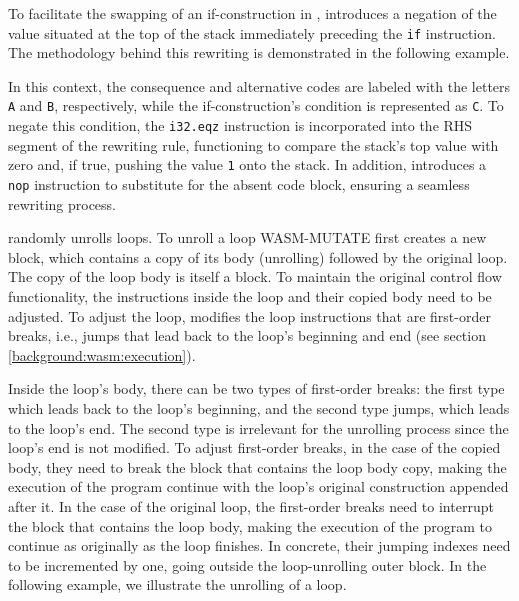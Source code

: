 To facilitate the swapping of an if-construction in \Wasm, \tool introduces a negation of the value situated at the top of the stack immediately preceding the \texttt{if} instruction. 
The methodology behind this rewriting is demonstrated in the following example.




In this context, the consequence and alternative codes are labeled with the letters \texttt{A} and \texttt{B}, respectively, while the if-construction's condition is represented as \texttt{C}. 
To negate this condition, the \texttt{i32.eqz} instruction is incorporated into the RHS segment of the rewriting rule, functioning to compare the stack's top value with zero and, if true, pushing the value \texttt{1} onto the stack.
In addition, \tool introduces a \texttt{nop} instruction to substitute for the absent code block, ensuring a seamless rewriting process.


 \tool randomly unrolls loops.
To unroll a loop WASM-MUTATE first creates a new \wasm block, which contains a copy of its body (unrolling) followed by the original loop.
The copy of the loop body is itself a \wasm block.
To maintain the original control flow functionality, the instructions inside the loop and their copied body need to be adjusted.
To adjust the loop, \tool modifies the loop instructions that are first-order breaks, i.e., jumps that lead back to the loop's beginning and end (see section \autoref{background:wasm:execution}). 

Inside the loop's body, there can be two types of first-order breaks: the first type which leads back to the loop's beginning, and the second type jumps, which leads to the loop's end.
The second type is irrelevant for the unrolling process since the loop's end is not modified.
To adjust first-order breaks, in the case of the copied body, they need to break the \wasm block that contains the loop body copy, making the execution of the program continue with the loop's original construction appended after it.
In the case of the original loop, the first-order breaks need to interrupt the block that contains the loop body, making the execution of the program to continue as originally as the loop finishes.
In concrete, their jumping indexes need to be incremented by one, going outside the loop-unrolling outer \wasm block.
In the following example, we illustrate the unrolling of a loop.



